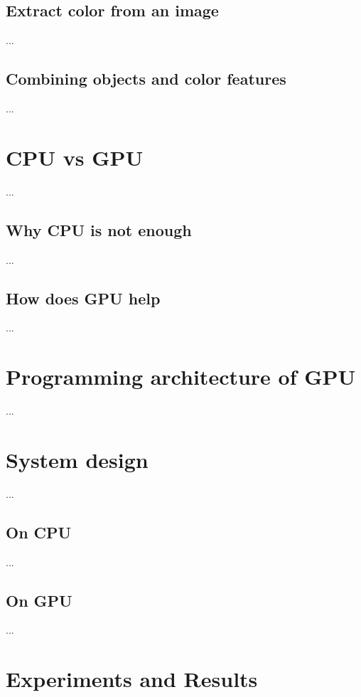 \documentclass[english]{tktltiki}
\begin{document}
\subsection{Extract color from an image}

...

\subsection{Combining objects and color features}

...

\section{CPU vs GPU}

...


\subsection{Why CPU is not enough}

...


\subsection{How does GPU help}

...


\section{Programming architecture of GPU}

...


\section{System design}

...

\subsection{On CPU}

...


\subsection{On GPU}

...


\section{Experiments and Results}
\end{document}
